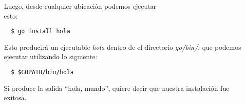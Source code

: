 \documentclass[12pt]{article}
\begin{document}
Luego, desde cualquier ubicación podemos ejecutar\\
esto:
\begin{verbatim}
  $ go install hola
\end{verbatim}

Esto producirá un ejecutable \textit{hola} dentro de el directorio \textit{go/bin/},
que podemos ejecutar utilizando lo siguiente:
\begin{verbatim}
  $ $GOPATH/bin/hola
\end{verbatim}

Si produce la salida ``hola, mundo'', quiere decir que nuestra instalación fue exitosa.
\end{document}
